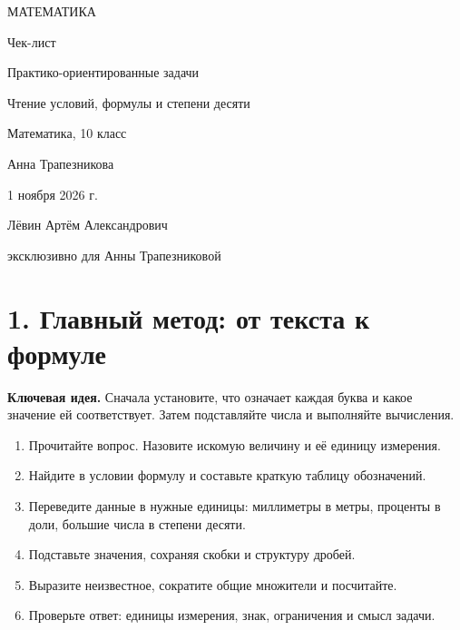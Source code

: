 \documentclass[a4paper,11pt]{article}
\newcommand{\topic}[1]{\section*{\textcolor{darkaccent}{#1}}}
\newcommand{\keyidea}[1]{\textcolor{darkaccent}{\textbf{Ключевая идея.}} #1}
\begin{document}
\thispagestyle{empty}
\begin{center}
\vspace*{25mm}
{\large\textcolor{darkaccent}{МАТЕМАТИКА}}\par
\vspace{24mm}
{\LARGE Чек-лист}\par
\vspace{16mm}
{\Large\color{accent} Практико-ориентированные задачи}\par
\vspace{3mm}
{\large\color{accent} Чтение условий, формулы и степени десяти}\par
\vspace{17mm}
{\normalsize Математика, 10 класс}\par
\vfill
{\large Анна Трапезникова}\par
\vspace{14mm}
{\normalsize 1 ноября 2026 г.}\par
\vspace{21mm}
{\small Лёвин Артём Александрович}\par
{\small эксклюзивно для Анны Трапезниковой}\par
\vspace{19mm}
\end{center}
\clearpage

\topic{1. Главный метод: от текста к формуле}

\keyidea{Сначала установите, что означает каждая буква и какое значение ей соответствует. Затем подставляйте числа и выполняйте вычисления.}

\begin{enumerate}[label=\textcolor{accent}{\arabic*.},itemsep=.3em]
\item Прочитайте вопрос. Назовите искомую величину и её единицу измерения.
\item Найдите в условии формулу и составьте краткую таблицу обозначений.
\item Переведите данные в нужные единицы: миллиметры в метры, проценты в доли, большие числа в степени десяти.
\item Подставьте значения, сохраняя скобки и структуру дробей.
\item Выразите неизвестное, сократите общие множители и посчитайте.
\item Проверьте ответ: единицы измерения, знак, ограничения и смысл задачи.
\end{enumerate}
\end{document}
